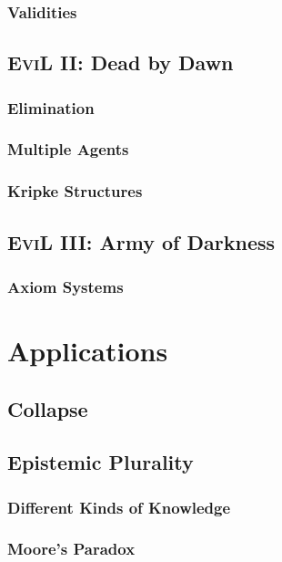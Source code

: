\documentclass[11pt]{article}
\numberwithin{equation}{subsection}
\begin{document}
\subsubsection{Validities}

\subsection{\textsc{EviL} II: Dead by Dawn}
\label{dead-by-dawn}
\subsubsection{Elimination}
\label{elimination}

\subsubsection{Multiple Agents}\label{multi-agent}
\subsubsection{Kripke Structures}


\subsection{\textsc{EviL} III: Army of Darkness}\label{army-of-darkness}
\subsubsection{Axiom Systems}\label{evil-axioms}



\section{Applications}
\subsection{Collapse}
\subsection{Epistemic Plurality}
\subsubsection{Different Kinds of Knowledge}
\subsubsection{Moore's Paradox}
\end{document}

